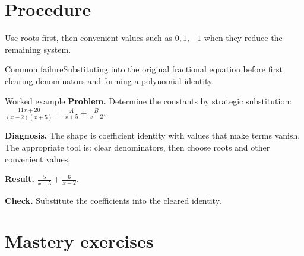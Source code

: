 \documentclass[11pt,oneside]{book}
\begin{document}
\section{Procedure}
Use roots first, then convenient values such as $0,1,-1$ when they reduce the remaining system.

\begin{warningbox}{Common failure}Substituting into the original fractional equation before first clearing denominators and forming a polynomial identity.\end{warningbox}
\begin{examplebox}{Worked example}
\textbf{Problem.} Determine the constants by strategic substitution: $\displaystyle \frac{11 x + 20}{\left(x - 2\right) \left(x + 5\right)}=\frac{A}{x + 5} + \frac{B}{x - 2}$.

\textbf{Diagnosis.} The shape is coefficient identity with values that make terms vanish. The appropriate tool is: clear denominators, then choose roots and other convenient values.

\textbf{Result.} $\displaystyle \frac{5}{x + 5} + \frac{6}{x - 2}$.

\textbf{Check.} Substitute the coefficients into the cleared identity.
\end{examplebox}
\section{Mastery exercises}
\end{document}
